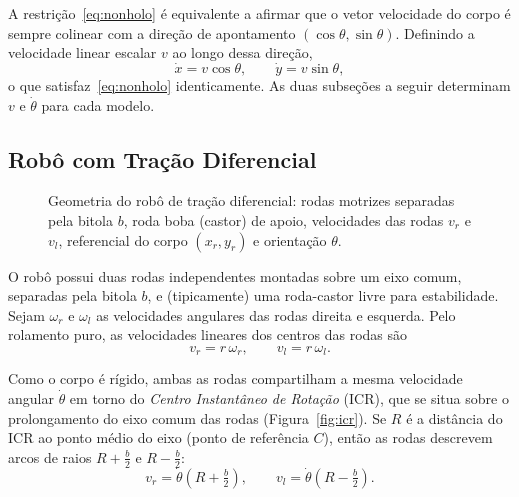 \documentclass[11pt,a4paper]{article}
\begin{document}
A restrição~\eqref{eq:nonholo} é equivalente a afirmar que o vetor
velocidade do corpo é sempre colinear com a direção de apontamento
$(\cos\theta,\sin\theta)$. Definindo a velocidade linear escalar
$v$ ao longo dessa direção,
\begin{equation}
  \dot{x} = v\cos\theta, \qquad \dot{y} = v\sin\theta,
  \label{eq:body-vel}
\end{equation}
o que satisfaz~\eqref{eq:nonholo} identicamente. As duas subseções a seguir
determinam $v$ e $\dot\theta$ para cada modelo.

\subsection{Robô com Tração Diferencial}

\begin{figure}[H]
  \centering
  \resizebox{0.62\textwidth}{!}{}
  \caption{Geometria do robô de tração diferencial: rodas motrizes separadas
  pela bitola $b$, roda boba (castor) de apoio, velocidades das rodas $v_r$ e
  $v_l$, referencial do corpo $(x_r,y_r)$ e orientação $\theta$.}
  \label{fig:diffdrive-geo}
\end{figure}

O robô possui duas rodas independentes montadas sobre um eixo comum,
separadas pela bitola $b$, e (tipicamente) uma roda-castor livre para
estabilidade. Sejam $\omega_r$ e $\omega_l$ as velocidades angulares das
rodas direita e esquerda. Pelo rolamento puro, as velocidades lineares dos
centros das rodas são
\begin{equation}
  v_r = r\,\omega_r, \qquad v_l = r\,\omega_l.
\end{equation}

Como o corpo é rígido, ambas as rodas compartilham a mesma velocidade
angular $\dot\theta$ em torno do \emph{Centro Instantâneo de Rotação} (ICR),
que se situa sobre o prolongamento do eixo comum das rodas
(Figura~\ref{fig:icr}). Se $R$ é a distância do ICR ao ponto médio do eixo
(ponto de referência $C$), então as rodas descrevem arcos de raios
$R+\tfrac{b}{2}$ e $R-\tfrac{b}{2}$:
\begin{equation}
  v_r = \dot\theta\left(R + \tfrac{b}{2}\right), \qquad
  v_l = \dot\theta\left(R - \tfrac{b}{2}\right).
  \label{eq:dd-arcs}
\end{equation}
\end{document}
